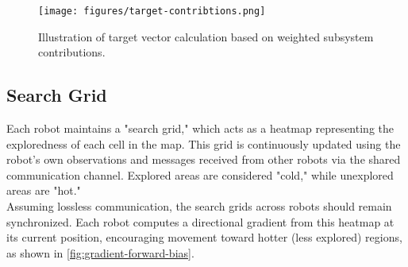 \begin{figure}[H]
    \begin{center}
        \texttt{[image: figures/target-contribtions.png]}
    \end{center}
    \caption{Illustration of target vector calculation based on weighted subsystem contributions.}
    \label{fig:target-contributions}
\end{figure}

\subsection{Search Grid}

Each robot maintains a "search grid," which acts as a heatmap representing the exploredness of each cell in the map. This grid is continuously updated using the robot’s own observations and messages received from other robots via the shared communication channel. Explored areas are considered "cold," while unexplored areas are "hot."\\

Assuming lossless communication, the search grids across robots should remain synchronized. Each robot computes a directional gradient from this heatmap at its current position, encouraging movement toward hotter (less explored) regions, as shown in \cref{fig:gradient-forward-bias}.

